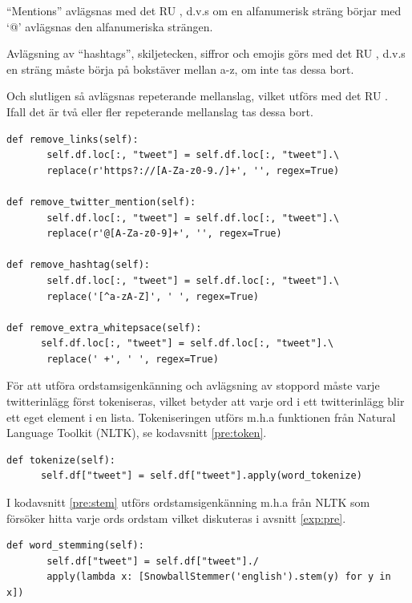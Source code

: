 \documentclass{kaumasters} %
\begin{document}
“Mentions” avlägsnas med det RU , d.v.s om en alfanumerisk sträng börjar med ‘@’ avlägsnas den alfanumeriska strängen.

Avlägsning av “hashtags”, skiljetecken, siffror och emojis görs med det RU , d.v.s en sträng måste börja på bokstäver mellan a-z, om inte tas dessa bort.

Och slutligen så avlägsnas repeterande mellanslag, vilket utförs med det RU . Ifall det är två eller fler repeterande mellanslag tas dessa bort.

\begin{lstlisting}[style=mypython,caption={Funktioner för att avlägsna URL:er, ''mention'', ''hashtags'', skiljetecken, siffror, emojis och repeterade mellanslag.},label=pre:rem]
def remove_links(self):
       self.df.loc[:, "tweet"] = self.df.loc[:, "tweet"].\
       replace(r'https?://[A-Za-z0-9./]+', '', regex=True)

def remove_twitter_mention(self):
       self.df.loc[:, "tweet"] = self.df.loc[:, "tweet"].\
       replace(r'@[A-Za-z0-9]+', '', regex=True)

def remove_hashtag(self):
       self.df.loc[:, "tweet"] = self.df.loc[:, "tweet"].\
       replace('[^a-zA-Z]', ' ', regex=True)

def remove_extra_whitepsace(self):
      self.df.loc[:, "tweet"] = self.df.loc[:, "tweet"].\
       replace(' +', ' ', regex=True)
\end{lstlisting}

För att utföra ordstamsigenkänning och avlägsning av stoppord måste varje twitterinlägg först tokeniseras, vilket betyder att varje ord i ett twitterinlägg blir ett eget element i en lista. Tokeniseringen utförs m.h.a funktionen  \cite{impl:006} från Natural Language Toolkit (NLTK), se kodavsnitt \ref{pre:token}.
\begin{lstlisting}[style=mypython,caption={Funktion för att tokenisera twitterinlägg.},label=pre:token]
def tokenize(self):
      self.df["tweet"] = self.df["tweet"].apply(word_tokenize)
\end{lstlisting}

I kodavsnitt \ref{pre:stem} utförs ordstamsigenkänning m.h.a  \cite{impl:008} från NLTK som försöker hitta varje ords ordstam vilket diskuteras i avsnitt \ref{exp:pre}.
\begin{lstlisting}[style=mypython,caption={Funktion för att utföra ordstamsigenkänning.},label=pre:stem]
def word_stemming(self):
       self.df["tweet"] = self.df["tweet"]./
       apply(lambda x: [SnowballStemmer('english').stem(y) for y in x])
\end{lstlisting}
\end{document}
